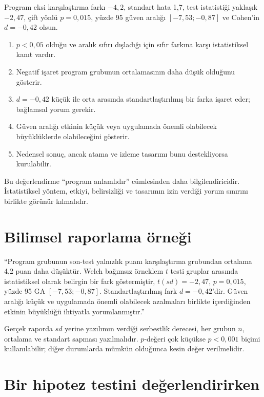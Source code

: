 Program eksi karşılaştırma farkı $-4{,}2$, standart hata 1,7, test
istatistiği yaklaşık $-2{,}47$, çift yönlü $p=0{,}015$, yüzde 95 güven aralığı
$[-7{,}53;-0{,}87]$ ve Cohen'in $d=-0{,}42$ olsun.

\begin{enumerate}
  \item $p<0{,}05$ olduğu ve aralık sıfırı dışladığı için sıfır farkına karşı istatistiksel kanıt vardır.
  \item Negatif işaret program grubunun ortalamasının daha düşük olduğunu gösterir.
  \item $d=-0{,}42$ küçük ile orta arasında standartlaştırılmış bir farka işaret eder; bağlamsal yorum gerekir.
  \item Güven aralığı etkinin küçük veya uygulamada önemli olabilecek büyüklüklerde olabileceğini gösterir.
  \item Nedensel sonuç, ancak atama ve izleme tasarımı bunu destekliyorsa kurulabilir.
\end{enumerate}

Bu değerlendirme ``program anlamlıdır'' cümlesinden daha bilgilendiricidir.
İstatistiksel yöntem, etkiyi, belirsizliği ve tasarımın izin verdiği yorum
sınırını birlikte görünür kılmalıdır.

\section{Bilimsel raporlama örneği}

``Program grubunun son-test yalnızlık puanı karşılaştırma grubundan ortalama
4,2 puan daha düşüktür. Welch bağımsız örneklem $t$ testi gruplar arasında
istatistiksel olarak belirgin bir fark göstermiştir, $t(sd)=-2{,}47$,
$p=0{,}015$, yüzde 95 GA $[-7{,}53;-0{,}87]$. Standartlaştırılmış fark
$d=-0{,}42$'dir. Güven aralığı küçük ve uygulamada önemli olabilecek
azalmaları birlikte içerdiğinden etkinin büyüklüğü ihtiyatla yorumlanmıştır.''

Gerçek raporda $sd$ yerine yazılımın verdiği serbestlik derecesi, her grubun
$n$, ortalama ve standart sapması yazılmalıdır. $p$-değeri çok küçükse
$p<0{,}001$ biçimi kullanılabilir; diğer durumlarda mümkün olduğunca kesin
değer verilmelidir.

\section{Bir hipotez testini değerlendirirken}

